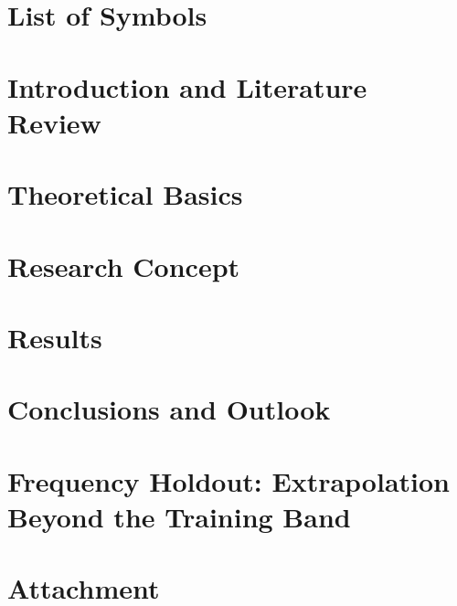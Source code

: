 \documentclass[11pt,a4paper]{scrreprt}
\begin{document}
\chapter*{List of Symbols} 

\endgroup

\chapter{Introduction and Literature Review}
\label{ch:intro}

\FloatBarrier
\newpage
\chapter{Theoretical Basics}
\label{ch:theory}

\FloatBarrier
\newpage
\chapter{Research Concept}
\label{ch:concept}

\FloatBarrier
\newpage

\chapter{Results}
\label{ch:results}

\FloatBarrier
\newpage
\chapter{Conclusions and Outlook}
\label{ch:conclusions}

\FloatBarrier
\newpage
\medskip
\printbibliography

\newpage
\appendix
\chapter{Frequency Holdout: Extrapolation Beyond the Training Band}

\newpage
\chapter{Attachment}

\newpage

\end{document}
